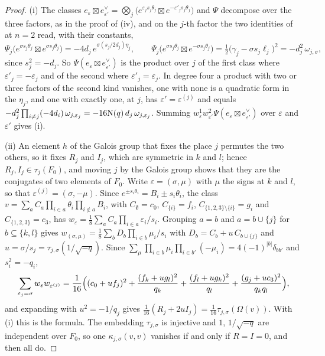 \begin{proof}
(i) The classes $e_{\varepsilon}\boxtimes e_{\varepsilon'}^{\vee}
=\bigotimes_{j}\bigl(e^{\varepsilon_{j}s_{j}\theta_{j}}\boxtimes
e^{-\varepsilon'_{j}s_{j}\theta_{j}}\bigr)$ and $\Psi$ decompose over the three
factors, as in the proof of (iv), and on the $j$-th
factor the two identities of  at $n=2$ read, with their
constants,
\[
  \Psi_{j}\bigl(e^{\sigma s_{j}\theta_{j}}\boxtimes e^{\sigma s_{j}\theta_{j}}\bigr)
  =-4d_{j}\,e^{\sigma(s_{j}/2d_{j})\eta_{j}},
  \qquad
  \Psi_{j}\bigl(e^{\sigma s_{j}\theta_{j}}\boxtimes e^{-\sigma s_{j}\theta_{j}}\bigr)
  =\tfrac12\bigl(\gamma_{j}-\sigma s_{j}\ell_{j}\bigr)^{2}
  =-d_{j}^{2}\,\omega_{j,\sigma},
\]
since $s_{j}^{2}=-d_{j}$. So
$\Psi(e_{\varepsilon}\boxtimes e_{\varepsilon'}^{\vee})$ is the product over
$j$ of the first class where $\varepsilon'_{j}=-\varepsilon_{j}$ and of the
second where $\varepsilon'_{j}=\varepsilon_{j}$. In degree four a product with
two or three factors of the second kind vanishes, one with none is a
quadratic form in the $\eta_{j}$, and one with exactly one, at $j$, has
$\varepsilon'=\varepsilon^{(j)}$ and equals
$-d_{j}^{2}\prod_{i\ne j}(-4d_{i})\,\omega_{j,\varepsilon_{j}}
=-16\mathrm{N}(q)\,d_{j}\,\omega_{j,\varepsilon_{j}}$. Summing
$w^{1}_{\varepsilon}w^{2}_{\varepsilon'}\Psi(e_{\varepsilon}\boxtimes
e_{\varepsilon'}^{\vee})$ over $\varepsilon$ and $\varepsilon'$ gives (i).

(ii) An element $h$ of the Galois group that fixes the place $j$ permutes
the two others, so it fixes $R_{j}$ and $I_{j}$, which are symmetric in $k$
and $l$; hence $R_{j},I_{j}\in\tau_{j}(F_{0})$, and moving $j$ by the Galois
group shows that they are the conjugates of two elements of $F_{0}$. Write
$\varepsilon=(\sigma,\mu)$ with $\mu$ the signs at $k$ and $l$, so that
$\varepsilon^{(j)}=(\sigma,-\mu)$. Since $e^{\pm s_{i}\theta_{i}}=B_{i}\pm
s_{i}\theta_{i}$, the class $v=\sum_{a}C_{a}\prod_{i\in a}\theta_{i}
\prod_{i\notin a}B_{i}$, with $C_{\emptyset}=c_{0}$, $C_{\{i\}}=f_{i}$,
$C_{\{1,2,3\}\setminus\{i\}}=g_{i}$ and $C_{\{1,2,3\}}=c_{3}$, has
$w_{\varepsilon}=\frac18\sum_{a}C_{a}\prod_{i\in a}\varepsilon_{i}/s_{i}$.
Grouping $a=b$ and $a=b\cup\{j\}$ for $b\subseteq\{k,l\}$ gives
$w_{(\sigma,\mu)}=\frac18\sum_{b}D_{b}\prod_{i\in b}\mu_{i}/s_{i}$ with
$D_{b}=C_{b}+u\,C_{b\cup\{j\}}$ and $u=\sigma/s_{j}=\tau_{j,\sigma}(1/\sqrt{-q})$.
Since $\sum_{\mu}\prod_{i\in b}\mu_{i}\prod_{i\in b'}(-\mu_{i})
=4(-1)^{|b|}\delta_{bb'}$ and $s_{i}^{2}=-q_{i}$,
\[
  \sum_{\varepsilon_{j}=\sigma}w_{\varepsilon}w_{\varepsilon^{(j)}}
  =\frac1{16}\Bigl((c_{0}+uf_{j})^{2}+\frac{(f_{k}+ug_{l})^{2}}{q_{k}}
  +\frac{(f_{l}+ug_{k})^{2}}{q_{l}}+\frac{(g_{j}+uc_{3})^{2}}{q_{k}q_{l}}\Bigr),
\]
and expanding with $u^{2}=-1/q_{j}$ gives $\frac1{16}(R_{j}+2uI_{j})
=\frac1{16}\tau_{j,\sigma}(\Omega(v))$. With (i) this is the formula. The
embedding $\tau_{j,\sigma}$ is injective and $1$, $1/\sqrt{-q}$ are
independent over $F_{0}$, so one $\kappa_{j,\sigma}(v,v)$ vanishes if and only
if $R=I=0$, and then all do.


\end{proof}
